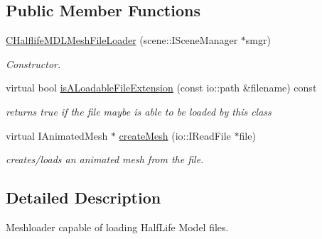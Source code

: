 \subsection*{Public Member Functions}
\begin{DoxyCompactItemize}
\item 
\hypertarget{classirr_1_1scene_1_1_c_halflife_m_d_l_mesh_file_loader_a9da15f9571ca10b69f67e7cab241f072}{\hyperlink{classirr_1_1scene_1_1_c_halflife_m_d_l_mesh_file_loader_a9da15f9571ca10b69f67e7cab241f072}{C\-Halflife\-M\-D\-L\-Mesh\-File\-Loader} (scene\-::\-I\-Scene\-Manager $\ast$smgr)}\label{classirr_1_1scene_1_1_c_halflife_m_d_l_mesh_file_loader_a9da15f9571ca10b69f67e7cab241f072}

\begin{DoxyCompactList}\small\item\em Constructor. \end{DoxyCompactList}\item 
virtual bool \hyperlink{classirr_1_1scene_1_1_c_halflife_m_d_l_mesh_file_loader_a8b7b5e4f6a4813487793caa52ecb501a}{is\-A\-Loadable\-File\-Extension} (const io\-::path \&filename) const 
\begin{DoxyCompactList}\small\item\em returns true if the file maybe is able to be loaded by this class \end{DoxyCompactList}\item 
virtual I\-Animated\-Mesh $\ast$ \hyperlink{classirr_1_1scene_1_1_c_halflife_m_d_l_mesh_file_loader_a11c26000684def0d73f6dcc1fcf57ad4}{create\-Mesh} (io\-::\-I\-Read\-File $\ast$file)
\begin{DoxyCompactList}\small\item\em creates/loads an animated mesh from the file. \end{DoxyCompactList}\end{DoxyCompactItemize}


\subsection{Detailed Description}
Meshloader capable of loading Half\-Life Model files. 

